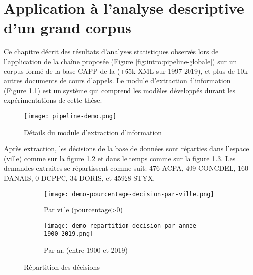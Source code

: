 \chapter{Application à l'analyse descriptive d'un grand corpus}
\label{chap:demo}
Ce chapitre décrit des résultats d'analyses statistiques observés lors de l'application de la chaîne proposée (Figure \ref{fig:intro:pipeline-globale}) sur un corpus formé de la base CAPP de la \citet{dila2019capp} (+65k XML sur 1997-2019), et plus de 10k autres documents de cours d'appels. Le module d'extraction d'information (Figure \ref{fig:demo:module-extraction}) est un système qui comprend les modèles développés durant les expérimentations de cette thèse. 



\begin{figure}[!htb]
	\centering 
	\texttt{[image: pipeline-demo.png]}
	\caption{Détails du module d'extraction d'information}\label{fig:demo:module-extraction}
\end{figure}

Après extraction, les décisions de la base de données sont réparties dans l'espace (ville) comme sur la figure \ref{fig:demo:doc-per-city} et dans le temps comme sur la figure \ref{fig:demo:doc-per-year}. Les demandes extraites se répartissent comme suit: 476 ACPA, 409 CONCDEL, 160 DANAIS, 0 DCPPC, 34 DORIS, et 45928 STYX.  

\begin{figure}[ht]
	\centering
	\begin{subfigure}[ht]{0.55\textwidth}
		\centering
		\centering
		\texttt{[image: demo-pourcentage-decision-par-ville.png]}
		\caption{Par ville (pourcentage>0)} \label{fig:demo:doc-per-city}
	\end{subfigure} 
	\begin{subfigure}[ht]{0.43\textwidth}
		\centering
		\texttt{[image: demo-repartition-decision-par-annee-1900\_2019.png]}
		\caption{Par an (entre 1900 et 2019)} \label{fig:demo:doc-per-year}
	\end{subfigure}
	\caption{Répartition des décisions} \label{fig:structuration:learning-curves}
\end{figure}


